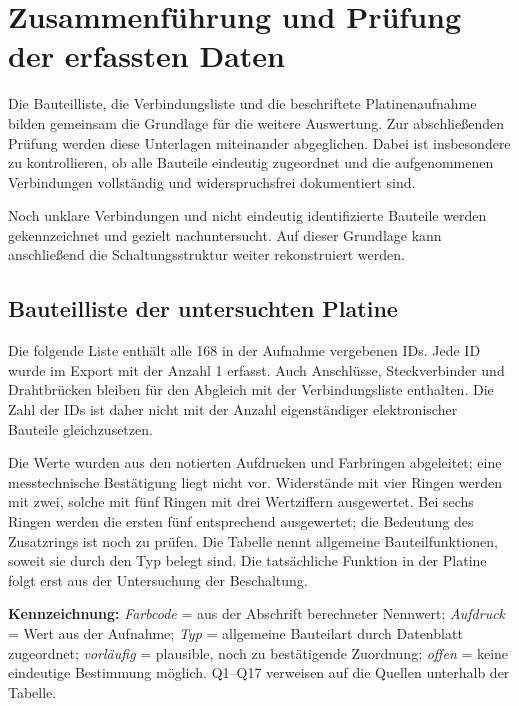\section{Zusammenführung und Prüfung der erfassten Daten}\label{sec:zusammenfuhrung-und-prufung-der-erfassten-daten}
Die Bauteilliste, die Verbindungsliste und die beschriftete Platinenaufnahme bilden gemeinsam die Grundlage für die weitere Auswertung.
Zur abschließenden Prüfung werden diese Unterlagen miteinander abgeglichen.
Dabei ist insbesondere zu kontrollieren, ob alle Bauteile eindeutig zugeordnet und die aufgenommenen Verbindungen vollständig und widerspruchsfrei dokumentiert sind.

Noch unklare Verbindungen und nicht eindeutig identifizierte Bauteile werden gekennzeichnet und gezielt nachuntersucht.
Auf dieser Grundlage kann anschließend die Schaltungsstruktur weiter rekonstruiert werden.

\subsection{Bauteilliste der untersuchten Platine}
\label{sec:bauteilliste}

Die folgende Liste enthält alle 168 in der Aufnahme vergebenen IDs.
Jede ID wurde im Export mit der Anzahl 1 erfasst. Auch Anschlüsse,
Steckverbinder und Drahtbrücken bleiben für den Abgleich mit der
Verbindungsliste enthalten. Die Zahl der IDs ist daher nicht mit
der Anzahl eigenständiger elektronischer Bauteile gleichzusetzen.

Die Werte wurden aus den notierten Aufdrucken und Farbringen abgeleitet;
eine messtechnische Bestätigung liegt nicht vor. Widerstände mit vier
Ringen werden mit zwei, solche mit fünf Ringen mit drei Wertziffern
ausgewertet. Bei sechs Ringen werden die ersten fünf entsprechend
ausgewertet; die Bedeutung des Zusatzrings ist noch zu prüfen.
Die Tabelle nennt allgemeine Bauteilfunktionen, soweit sie durch den Typ
belegt sind. Die tatsächliche Funktion in der Platine folgt erst aus
der Untersuchung der Beschaltung.

\textbf{Kennzeichnung:} \emph{Farbcode} = aus der Abschrift berechneter
Nennwert; \emph{Aufdruck} = Wert aus der Aufnahme;
\emph{Typ} = allgemeine Bauteilart durch Datenblatt zugeordnet;
\emph{vorläufig} = plausible, noch zu bestätigende Zuordnung;
\emph{offen} = keine eindeutige Bestimmung möglich.
Q1--Q17 verweisen auf die Quellen unterhalb der Tabelle.

